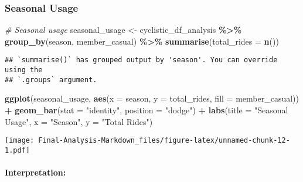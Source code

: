 \documentclass[
]{article}
\newenvironment{Shaded}{\begin{snugshade}}{\end{snugshade}}
\newcommand{\AttributeTok}[1]{\textcolor[rgb]{0.13,0.29,0.53}{#1}}
\newcommand{\CommentTok}[1]{\textcolor[rgb]{0.56,0.35,0.01}{\textit{#1}}}
\newcommand{\FunctionTok}[1]{\textcolor[rgb]{0.13,0.29,0.53}{\textbf{#1}}}
\newcommand{\NormalTok}[1]{#1}
\newcommand{\OtherTok}[1]{\textcolor[rgb]{0.56,0.35,0.01}{#1}}
\newcommand{\SpecialCharTok}[1]{\textcolor[rgb]{0.81,0.36,0.00}{\textbf{#1}}}
\newcommand{\StringTok}[1]{\textcolor[rgb]{0.31,0.60,0.02}{#1}}
\begin{document}
\subsubsection{Seasonal Usage}\label{seasonal-usage}

\begin{Shaded}
\begin{Highlighting}[]
\CommentTok{\# Seasonal usage}
\NormalTok{seasonal\_usage }\OtherTok{\textless{}{-}}\NormalTok{ cyclistic\_df\_analysis }\SpecialCharTok{\%\textgreater{}\%}
  \FunctionTok{group\_by}\NormalTok{(season, member\_casual) }\SpecialCharTok{\%\textgreater{}\%}
  \FunctionTok{summarise}\NormalTok{(}\AttributeTok{total\_rides =} \FunctionTok{n}\NormalTok{())}
\end{Highlighting}
\end{Shaded}

\begin{verbatim}
## `summarise()` has grouped output by 'season'. You can override using the
## `.groups` argument.
\end{verbatim}

\begin{Shaded}
\begin{Highlighting}[]
\FunctionTok{ggplot}\NormalTok{(seasonal\_usage, }\FunctionTok{aes}\NormalTok{(}\AttributeTok{x =}\NormalTok{ season, }\AttributeTok{y =}\NormalTok{ total\_rides, }\AttributeTok{fill =}\NormalTok{ member\_casual)) }\SpecialCharTok{+}
  \FunctionTok{geom\_bar}\NormalTok{(}\AttributeTok{stat =} \StringTok{"identity"}\NormalTok{, }\AttributeTok{position =} \StringTok{"dodge"}\NormalTok{) }\SpecialCharTok{+}
  \FunctionTok{labs}\NormalTok{(}\AttributeTok{title =} \StringTok{"Seasonal Usage"}\NormalTok{, }\AttributeTok{x =} \StringTok{"Season"}\NormalTok{, }\AttributeTok{y =} \StringTok{"Total Rides"}\NormalTok{)}
\end{Highlighting}
\end{Shaded}

\texttt{[image: Final-Analysis-Markdown\_files/figure-latex/unnamed-chunk-12-1.pdf]}

\paragraph{Interpretation:}\label{interpretation-3}
\end{document}
